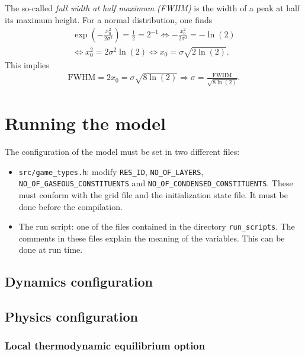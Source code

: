 \documentclass[10pt]{report}
\begin{document}
The so-called \textit{full width at half maximum (FWHM)} is the width of a peak at half its maximum height. For a normal distribution, one finds
%
\begin{align}
\exp\left(-\frac{x_0^2}{2\sigma^2}\right) = \frac{1}{2} = 2^{-1}\Leftrightarrow -\frac{x_0^2}{2\sigma^2} = -\ln\left(2\right)\nonumber\\
\Leftrightarrow x_0^2 = 2\sigma^2\ln\left(2\right)\Leftrightarrow x_0 = \sigma\sqrt{2\ln\left(2\right)}.
\end{align}
%
This implies
%
\begin{align}
\text{FWHM} = 2x_0 = \sigma\sqrt{8\ln\left(2\right)} \Rightarrow \sigma = \frac{\text{FWHM}}{\sqrt{8\ln\left(2\right)}}.
\end{align}

\chapter{Running the model}
\label{chap:running_the_model}

The configuration of the model must be set in two different files:
%
\begin{itemize}
\item \texttt{src/game\_types.h}: modify \texttt{RES\_ID}, \texttt{NO\_OF\_LAYERS}, \texttt{NO\_OF\_GASEOUS\_CONSTITUENTS} and \texttt{NO\_OF\_CONDENSED\_CONSTITUENTS}. These must conform with the grid file and the initialization state file. It must be done before the compilation.
\item The run script: one of the files contained in the directory \texttt{run\_scripts}. The comments in these files explain the meaning of the variables. This can be done at run time.
\end{itemize}

\section{Dynamics configuration}
\label{sec:dynamics_configuration}

\section{Physics configuration}
\label{sec:physics_configuration}

\subsection{Local thermodynamic equilibrium option}
\label{sec:local_thermodynamic_equilibrium_option}
\end{document}
